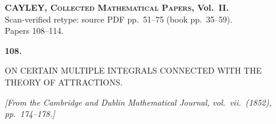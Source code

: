 \documentclass[11pt]{article}
\begin{document}
\begin{center}
{\large\bfseries CAYLEY, \textsc{Collected Mathematical Papers}, Vol.\ II.}\\[0.3em]
{\small Scan-verified retype: source PDF pp.\ 51--75 (book pp.\ 35--59).}\\[0.2em]
{\footnotesize Papers 108--114.}
\end{center}

\bigskip


\begin{center}\textbf{108.}\par\medskip
{\large ON CERTAIN MULTIPLE INTEGRALS CONNECTED WITH THE\\
THEORY OF ATTRACTIONS.}
\end{center}

\noindent\emph{[From the Cambridge and Dublin Mathematical Journal, vol.\ vii.\ (1852), pp.\ 174--178.]}

\bigskip
\end{document}

